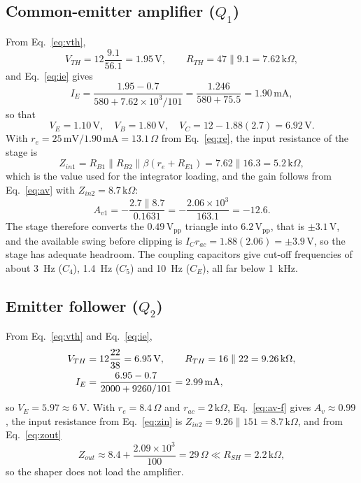 \documentclass[12pt,a4paper]{article}
\begin{document}
	\subsection{Common-emitter amplifier ($Q_1$)}
	From Eq.~\eqref{eq:vth},
	\begin{equation}
		V_{TH}=12\frac{9.1}{56.1}=1.95\,\mathrm{V},
		\qquad
		R_{TH}=47\parallel9.1=7.62\,\mathrm{k}\Omega,
		\label{eq:calc-vth1}
	\end{equation}
	and Eq.~\eqref{eq:ie} gives
	\begin{equation}
		I_E=\frac{1.95-0.7}{580+7.62\times10^{3}/101}=\frac{1.246}{580+75.5}=1.90\,\mathrm{mA},
		\label{eq:calc-ie1}
	\end{equation}
	so that
	\begin{equation}
		V_E=1.10\,\mathrm{V},\quad V_B=1.80\,\mathrm{V},\quad V_C=12-1.88(2.7)=6.92\,\mathrm{V}.
		\label{eq:calc-q1dc}
	\end{equation}
	With $r_e=25\,\mathrm{mV}/1.90\,\mathrm{mA}=13.1\,\Omega$ from Eq.~\eqref{eq:re}, the input resistance of the stage is
	\begin{equation}
		Z_{in1}=R_{B1}\parallel R_{B2}\parallel\beta(r_e+R_{E1})=7.62\parallel16.3=5.2\,\mathrm{k}\Omega,
		\label{eq:calc-zin1}
	\end{equation}
	which is the value used for the integrator loading, and the gain follows from Eq.~\eqref{eq:av} with $Z_{in2}=8.7\,\mathrm{k}\Omega$:
	\begin{equation}
		A_{v1}=-\frac{2.7\parallel8.7}{0.1631}=-\frac{2.06\times10^{3}}{163.1}=-12.6 .
		\label{eq:calc-av1}
	\end{equation}
	The stage therefore converts the $0.49\,\mathrm{V_{pp}}$ triangle into $6.2\,\mathrm{V_{pp}}$, that is $\pm3.1\,\mathrm{V}$, and the available swing before clipping is $I_Cr_{ac}=1.88(2.06)=\pm3.9\,\mathrm{V}$, so the stage has adequate headroom. The coupling capacitors give cut-off frequencies of about \SI{3}{\hertz} ($C_4$), \SI{1.4}{\hertz} ($C_5$) and \SI{10}{\hertz} ($C_E$), all far below \SI{1}{\kilo\hertz}.

	\subsection{Emitter follower ($Q_2$)}
	From Eq.~\eqref{eq:vth} and Eq.~\eqref{eq:ie},
	\begin{align}
		V_{TH}&=12\frac{22}{38}=6.95\,\mathrm{V},\qquad R_{TH}=16\parallel22=9.26\,\mathrm{k}\Omega,\notag\\
		I_E&=\frac{6.95-0.7}{2000+9260/101}=2.99\,\mathrm{mA},
		\label{eq:calc-q2}
	\end{align}
	so $V_E=5.97\approx\SI{6}{\volt}$. With $r_e=8.4\,\Omega$ and $r_{ac}=2\,\mathrm{k}\Omega$, Eq.~\eqref{eq:av-f} gives $A_v\approx0.99$, the input resistance from Eq.~\eqref{eq:zin} is $Z_{in2}=9.26\parallel151=8.7\,\mathrm{k}\Omega$, and from Eq.~\eqref{eq:zout}
	\begin{equation}
		Z_{out}\approx8.4+\frac{2.09\times10^{3}}{100}=29\,\Omega\ll R_{SH}=2.2\,\mathrm{k}\Omega,
		\label{eq:calc-zout2}
	\end{equation}
	so the shaper does not load the amplifier.
\end{document}
